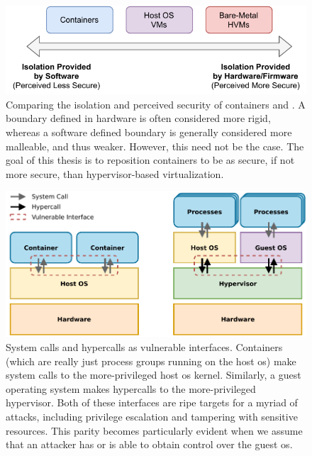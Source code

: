 \begin{figure}[htbp]
  \centering
  \includegraphics[width=0.8\linewidth]{figs/confinement-problem/security.pdf}
  \caption[Comparing the isolation and perceived security of containers and ]{
    Comparing the isolation and perceived security of containers and
    . A boundary defined in hardware is often considered more rigid,
    whereas a software defined boundary is generally considered more malleable, and thus
    weaker. However, this need not be the case. The goal of this thesis is to reposition
    containers to be as secure, if not more secure, than hypervisor-based virtualization.
  }%
  \label{fig:container-hvm-security}
\end{figure}

\begin{figure}[htbp]
  \centering
  \includegraphics[width=0.8\linewidth]{figs/confinement-problem/syscall-hypercall.pdf}
  \caption[System calls and hypercalls as vulnerable interfaces]{
    System calls and hypercalls as vulnerable interfaces. Containers (which are really
    just process groups running on the host \gls{os}) make system calls to the
    more-privileged host \gls{os} kernel. Similarly, a guest operating system makes
    hypercalls to the more-privileged hypervisor. Both of these interfaces are ripe
    targets for a myriad of attacks, including privilege escalation and tampering with
    sensitive resources. This parity becomes particularly evident when we assume that an
    attacker has or is able to obtain control over the guest \gls{os}.
  }%
  \label{fig:syscall-hypercall}
\end{figure}

